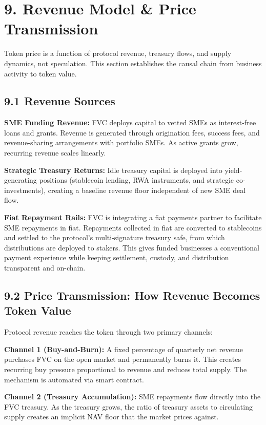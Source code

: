 \documentclass[
  paper=a4,
  ,captions=tableheading
]{scrartcl}
\begin{document}
\section{9. Revenue Model \& Price Transmission}\label{revenue-model}

Token price is a function of protocol revenue, treasury flows, and supply dynamics, not speculation. This section establishes the causal chain from business activity to token value.

\subsection{9.1 Revenue Sources}\label{revenue-sources}

\textbf{SME Funding Revenue:} FVC deploys capital to vetted SMEs as interest-free loans and grants. Revenue is generated through origination fees, success fees, and revenue-sharing arrangements with portfolio SMEs. As active grants grow, recurring revenue scales linearly.

\textbf{Strategic Treasury Returns:} Idle treasury capital is deployed into yield-generating positions (stablecoin lending, RWA instruments, and strategic co-investments), creating a baseline revenue floor independent of new SME deal flow.

\textbf{Fiat Repayment Rails:} FVC is integrating a fiat payments partner to facilitate SME repayments in fiat. Repayments collected in fiat are converted to stablecoins and settled to the protocol's multi-signature treasury safe, from which distributions are deployed to stakers. This gives funded businesses a conventional payment experience while keeping settlement, custody, and distribution transparent and on-chain.

\subsection{9.2 Price Transmission: How Revenue Becomes Token Value}\label{price-transmission}

Protocol revenue reaches the token through two primary channels:

\textbf{Channel 1 (Buy-and-Burn):} A fixed percentage of quarterly net revenue purchases FVC on the open market and permanently burns it. This creates recurring buy pressure proportional to revenue and reduces total supply. The mechanism is automated via smart contract.

\textbf{Channel 2 (Treasury Accumulation):} SME repayments flow directly into the FVC treasury. As the treasury grows, the ratio of treasury assets to circulating supply creates an implicit NAV floor that the market prices against.
\end{document}
